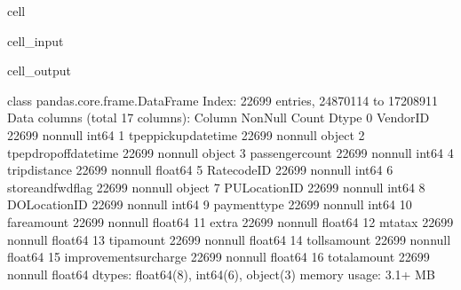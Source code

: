 \documentclass[letterpaper,10pt,english]{sphinxmanual}
\begin{document}
\begin{sphinxuseclass}{cell}
\begin{sphinxuseclass}{cell_input}
\begin{sphinxVerbatim}[commandchars=\\\{\}]
\end{sphinxVerbatim}

\end{sphinxuseclass}
\begin{sphinxuseclass}{cell_output}
\begin{sphinxVerbatim}[commandchars=\\\{\}]
\PYGZlt{}class \PYGZsq{}pandas.core.frame.DataFrame\PYGZsq{}\PYGZgt{}
Index: 22699 entries, 24870114 to 17208911
Data columns (total 17 columns):
 \PYGZsh{}   Column                 Non\PYGZhy{}Null Count  Dtype  
\PYGZhy{}\PYGZhy{}\PYGZhy{}  \PYGZhy{}\PYGZhy{}\PYGZhy{}\PYGZhy{}\PYGZhy{}\PYGZhy{}                 \PYGZhy{}\PYGZhy{}\PYGZhy{}\PYGZhy{}\PYGZhy{}\PYGZhy{}\PYGZhy{}\PYGZhy{}\PYGZhy{}\PYGZhy{}\PYGZhy{}\PYGZhy{}\PYGZhy{}\PYGZhy{}  \PYGZhy{}\PYGZhy{}\PYGZhy{}\PYGZhy{}\PYGZhy{}  
 0   VendorID               22699 non\PYGZhy{}null  int64  
 1   tpep\PYGZus{}pickup\PYGZus{}datetime   22699 non\PYGZhy{}null  object 
 2   tpep\PYGZus{}dropoff\PYGZus{}datetime  22699 non\PYGZhy{}null  object 
 3   passenger\PYGZus{}count        22699 non\PYGZhy{}null  int64  
 4   trip\PYGZus{}distance          22699 non\PYGZhy{}null  float64
 5   RatecodeID             22699 non\PYGZhy{}null  int64  
 6   store\PYGZus{}and\PYGZus{}fwd\PYGZus{}flag     22699 non\PYGZhy{}null  object 
 7   PULocationID           22699 non\PYGZhy{}null  int64  
 8   DOLocationID           22699 non\PYGZhy{}null  int64  
 9   payment\PYGZus{}type           22699 non\PYGZhy{}null  int64  
 10  fare\PYGZus{}amount            22699 non\PYGZhy{}null  float64
 11  extra                  22699 non\PYGZhy{}null  float64
 12  mta\PYGZus{}tax                22699 non\PYGZhy{}null  float64
 13  tip\PYGZus{}amount             22699 non\PYGZhy{}null  float64
 14  tolls\PYGZus{}amount           22699 non\PYGZhy{}null  float64
 15  improvement\PYGZus{}surcharge  22699 non\PYGZhy{}null  float64
 16  total\PYGZus{}amount           22699 non\PYGZhy{}null  float64
dtypes: float64(8), int64(6), object(3)
memory usage: 3.1+ MB
\end{sphinxVerbatim}

\end{sphinxuseclass}
\end{sphinxuseclass}
\end{document}
